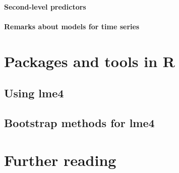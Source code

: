 \documentclass[a4paper,12pt]{article}
\begin{document}
\paragraph{Second-level predictors}
\paragraph{Remarks about models for time series}

\section{Packages and tools in R}
\label{sec:estimationofhierarchicalmodelsinr}

\subsection{Using lme4}
\label{sec:usinglme4}


\subsection{Bootstrap methods for lme4}
\label{sec:bootstrapestimationforlme4}

%
%
%

\section{Further reading}
\label{sec:furtherreading}


\printbibliography
\end{document}
